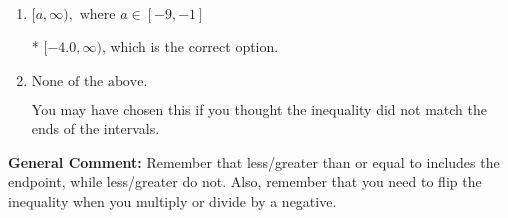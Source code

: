 \documentclass{extbook}[14pt]
\begin{document}
\begin{enumerate}
{\begin{enumerate}[label=\Alph*.]
 $(-\infty, -4.0]$, which corresponds to switching the direction of the interval. You likely did this if you did not flip the inequality when dividing by a negative!
\item \( [a, \infty), \text{ where } a \in [-9, -1] \)

* $[-4.0, \infty)$, which is the correct option.
\item \( \text{None of the above}. \)

You may have chosen this if you thought the inequality did not match the ends of the intervals.
\end{enumerate}

\textbf{General Comment:} Remember that less/greater than or equal to includes the endpoint, while less/greater do not. Also, remember that you need to flip the inequality when you multiply or divide by a negative.
}
\end{enumerate}
\end{document}
